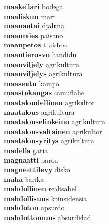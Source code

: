 \textbf{maakellari } bodega \\
\textbf{maaliskuu } mart \\
\textbf{maanantai } djaluna \\
\textbf{maanmies } paisano \\
\textbf{maanpetos } traishon \\
\textbf{maantierosvo } bandidu \\
\textbf{maanviljely } agrikultura \\
\textbf{maanviljelys } agrikultura \\
\textbf{maaseutu } kampo \\
\textbf{maastokangas } camuflahe \\
\textbf{maataloudellinen } agrikultor \\
\textbf{maatalous } agrikultura \\
\textbf{maatalouselinkeino } agrikultura \\
\textbf{maatalousvaltainen } agrikultor \\
\textbf{maatalousyritys } agrikultura \\
\textbf{madella } gatia \\
\textbf{magnaatti } baron \\
\textbf{magneettilevy } disko \\
\textbf{maha } barika \\
\textbf{mahdollinen } realisabel \\
\textbf{mahdollisuus } koinsidensia \\
\textbf{mahdoton } apsurdo \\
\textbf{mahdottomuus } absurdidad \\
